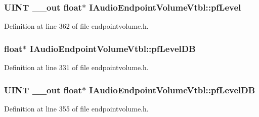 \subsubsection[{\texorpdfstring{pf\+Level}{pfLevel}}]{ {\bf U\+I\+NT} {\bf \+\_\+\+\_\+out} float$\ast$ I\+Audio\+Endpoint\+Volume\+Vtbl\+::pf\+Level}\hypertarget{struct_i_audio_endpoint_volume_vtbl_aae251eaf9a15c9ca90c58fc2d8ad15bf}{}\label{struct_i_audio_endpoint_volume_vtbl_aae251eaf9a15c9ca90c58fc2d8ad15bf}


Definition at line 362 of file endpointvolume.\+h.

\subsubsection[{\texorpdfstring{pf\+Level\+DB}{pfLevelDB}}]{ float$\ast$ I\+Audio\+Endpoint\+Volume\+Vtbl\+::pf\+Level\+DB}\hypertarget{struct_i_audio_endpoint_volume_vtbl_a29fc9372caaf42775864bdc473ccd128}{}\label{struct_i_audio_endpoint_volume_vtbl_a29fc9372caaf42775864bdc473ccd128}


Definition at line 331 of file endpointvolume.\+h.

\subsubsection[{\texorpdfstring{pf\+Level\+DB}{pfLevelDB}}]{ {\bf U\+I\+NT} {\bf \+\_\+\+\_\+out} float$\ast$ I\+Audio\+Endpoint\+Volume\+Vtbl\+::pf\+Level\+DB}\hypertarget{struct_i_audio_endpoint_volume_vtbl_a4200f0c1c39b23ff2a2452414ba9a41e}{}\label{struct_i_audio_endpoint_volume_vtbl_a4200f0c1c39b23ff2a2452414ba9a41e}


Definition at line 355 of file endpointvolume.\+h.

